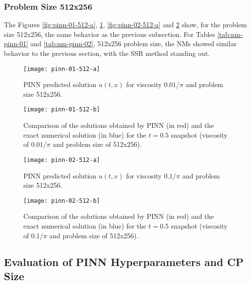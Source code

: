 \subsubsection{Problem Size 512x256}

The Figures \ref{fig:pinn-01-512-a}, \ref{fig:pinn-01-512-b}, \ref{fig:pinn-02-512-a} and \ref{fig:pinn-02-512-b} show, for the problem size 512x256, the same behavior as the previous subsection. For Tables \ref{tab:nm-pinn-01} and \ref{tab:nm-pinn-02}, 512x256 problem size, the NMs showed similar behavior to the previous section, with the SSR method standing out.

\begin{figure}[htb]\begin{minipage}[b]{\textwidth}\centering
\texttt{[image: pinn-01-512-a]}
\vspace{-1em}
\caption{PINN predicted solution $u(t, x)$ for viscosity ${0.01}/{\pi}$ and problem size 512x256.}
\label{fig:pinn-01-512-a}
\texttt{[image: pinn-01-512-b]}
\vspace{-1em}
\caption{Comparison of the solutions obtained by PINN (in red) and the exact numerical solution (in blue) for the $t=0.5$ snapshot (viscosity of ${0.01}/{\pi}$ and problem size of 512x256).}
\label{fig:pinn-01-512-b}
\end{minipage}\end{figure}

\begin{figure}[htb]\begin{minipage}[b]{\textwidth}\centering
\texttt{[image: pinn-02-512-a]}
\vspace{-1em}
\caption{PINN predicted solution $u(t, x)$ for viscosity ${0.1}/{\pi}$ and problem size 512x256.}
\label{fig:pinn-02-512-a}
\texttt{[image: pinn-02-512-b]}
\vspace{-1em}
\caption{Comparison of the solutions obtained by PINN (in red) and the exact numerical solution (in blue) for the $t=0.5$ snapshot (viscosity of ${0.1}/{\pi}$ and problem size of 512x256).}
\label{fig:pinn-02-512-b}
\end{minipage}\end{figure}

\FloatBarrier

\subsection{Evaluation of PINN Hyperparameters and CP Size}

